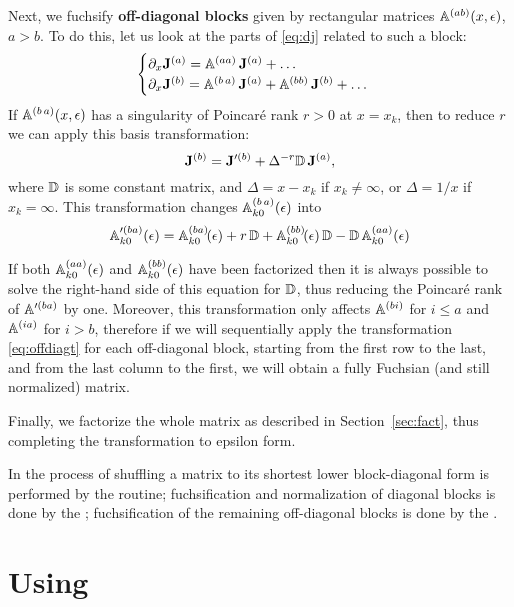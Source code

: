 \documentclass[12pt,a4paper]{article}
\begin{document}
Next, we fuchsify {\bf off-diagonal blocks} given by rectangular matrices $\mathbb{A}^{(ab)}(x,\epsilon)$, $a > b$.
To do this, let us look at the parts of \eqref{eq:dj} related to such a block:
\begin{equation}
  \begin{cases}
  \partial_x \mathbf{J}^{(a)} =
    \mathbb{A}^{(aa)}\,\mathbf{J}^{(a)} + \ldots \\
  \partial_x \mathbf{J}^{(b)} =
    \mathbb{A}^{(b\,a)}\,\mathbf{J}^{(a)} +
    \mathbb{A}^{(bb)}\,\mathbf{J}^{(b)} + \ldots
  \end{cases}
\end{equation}
If $\mathbb{A}^{(b\,a)}(x,\epsilon)$ has a singularity of Poincar\'e rank $r>0$ at $x=x_k$, then to reduce $r$ we can apply this basis transformation:
\begin{equation}
  \label{eq:offdiagt}
  \mathbf{J}^{(b)} = \mathbf{J}'^{(b)} + \Delta^{-r} \mathbb{D}\, \mathbf{J}^{(a)},
\end{equation}
where $\mathbb{D}$ is some constant matrix, and $\Delta=x-x_k$ if $x_k\ne\infty$, or $\Delta=1/x$ if $x_k=\infty$.
This transformation changes $\mathbb{A}^{(b\,a)}_{k0}(\epsilon)$ into
\begin{equation}
  \mathbb{A}'^{(ba)}_{k0}(\epsilon) = \mathbb{A}^{(ba)}_{k0}\!(\epsilon) + r\,\mathbb{D} + \mathbb{A}^{(bb)}_{k0}\!(\epsilon) \, \mathbb{D} - \mathbb{D}\, \mathbb{A}^{(aa)}_{k0}(\epsilon)
\end{equation}

If both $\mathbb{A}^{(aa)}_{k0}(\epsilon)$ and $\mathbb{A}^{(bb)}_{k0}(\epsilon)$ have been factorized then it is always possible to solve the right-hand side of this equation for $\mathbb{D}$, thus reducing the Poincar\'e rank of $\mathbb{A}'^{(ba)}$ by one.
Moreover, this transformation only affects $\mathbb{A}^{(bi)}$ for $i \le a$ and $\mathbb{A}^{(ia)}$ for $i > b$, therefore if we will sequentially apply the transformation \eqref{eq:offdiagt} for each off-diagonal block, starting from the first row to the last, and from the last column to the first, we will obtain a fully Fuchsian (and still normalized) matrix.

Finally, we factorize the whole matrix as described in Section~\ref{sec:fact}, thus completing the transformation to epsilon form.

In \fuchsia the process of shuffling a matrix to its shortest lower block-diagonal form is performed by the  routine; fuchsification and normalization of diagonal blocks is done by the ; fuchsification of the remaining off-diagonal blocks is done by the .


\section{Using \fuchsia}
\label{sec:3}
\end{document}
